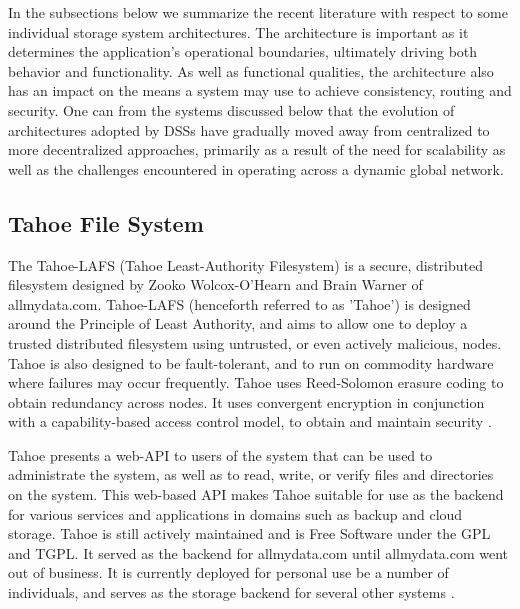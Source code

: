 \documentclass[11pt]{article}
\begin{document}
In the subsections below we summarize the recent literature with
respect to some individual storage system architectures. The
architecture is important as it determines the application’s
operational boundaries, ultimately driving both behavior and
functionality. As well as functional qualities, the architecture also
has an impact on the means a system may use to achieve consistency,
routing and security. One can from the systems discussed below that
the evolution of architectures adopted by DSSs have gradually moved
away from centralized to more decentralized approaches, primarily as a
result of the need for scalability as well as the challenges
encountered in operating across a dynamic global network.


\subsection{Tahoe File System}

The Tahoe-LAFS (Tahoe Least-Authority Filesystem) is a secure,
distributed filesystem designed by Zooko Wolcox-O'Hearn and Brain
Warner of allmydata.com. Tahoe-LAFS (henceforth referred to as
'Tahoe') is designed around the Principle of Least Authority, and aims
to allow one to deploy a trusted distributed filesystem using
untrusted, or even actively malicious, nodes. Tahoe is also designed
to be fault-tolerant, and to run on commodity hardware where failures
may occur frequently. Tahoe uses Reed-Solomon erasure coding to obtain
redundancy across nodes. It uses convergent encryption in conjunction
with a capability-based access control model, to obtain and maintain
security \cite{WilcoxOHearn:2008p1275}.

Tahoe presents a web-API to users of the system that can be used to
administrate the system, as well as to read, write, or verify files
and directories on the system. This web-based API makes Tahoe suitable
for use as the backend for various services and applications in
domains such as backup and cloud storage. Tahoe is still actively
maintained and is Free Software under the GPL and TGPL. It served as
the backend for allmydata.com until allmydata.com went out of
business. It is currently deployed for personal use be a number of
individuals, and serves as the storage backend for several other
systems \cite{tahoe-lafs.org}.
\end{document}
